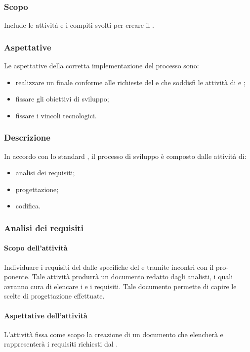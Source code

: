 \subsubsection{Scopo}
Include le attività e i compiti svolti per creare il .
\subsubsection{Aspettative}
Le aspettative della corretta implementazione del processo sono:
\begin{itemize}
		\item realizzare un  finale conforme alle richieste del  e che soddisfi le attività di  e ;
		\item fissare gli obiettivi di sviluppo;
		\item fissare i vincoli tecnologici.
\end{itemize}

\subsubsection{Descrizione}
In accordo con lo standard , il processo di sviluppo è composto dalle attività di:
\begin{itemize}
		\item analisi dei requisiti;
		\item progettazione;
		\item codifica.
\end{itemize}

\subsubsection{Analisi dei requisiti}
 \paragraph{Scopo dell'attività}
  Individuare i requisiti del  dalle specifiche del  e tramite incontri con il pro-
  ponente. Tale attività produrrà un documento redatto dagli analisti, i quali avranno cura di elencare i  e i requisiti. Tale documento permette di
 capire le scelte di progettazione effettuate.
 \paragraph{Aspettative dell'attività}
 L'attività fissa come scopo la creazione di un documento che elencherà e rappresenterà i requisiti richiesti dal .
